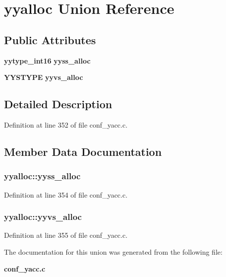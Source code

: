 \section{yyalloc Union Reference}
\label{unionyyalloc}
\subsection*{Public Attributes}
\begin{DoxyCompactItemize}
\item 
{\bf yytype\_\-int16} {\bf yyss\_\-alloc}
\item 
{\bf YYSTYPE} {\bf yyvs\_\-alloc}
\end{DoxyCompactItemize}


\subsection{Detailed Description}


Definition at line 352 of file conf\_\-yacc.c.

\subsection{Member Data Documentation}
\subsubsection[{yyss\_\-alloc}]{ {\bf yyalloc::yyss\_\-alloc}}\label{unionyyalloc_a4800e0520a89a4789afa7b5d82197e65}


Definition at line 354 of file conf\_\-yacc.c.
\subsubsection[{yyvs\_\-alloc}]{ {\bf yyalloc::yyvs\_\-alloc}}\label{unionyyalloc_a9326f4fdc6f737a929444427836d8928}


Definition at line 355 of file conf\_\-yacc.c.

The documentation for this union was generated from the following file:\begin{DoxyCompactItemize}
\item 
{\bf conf\_\-yacc.c}\end{DoxyCompactItemize}
